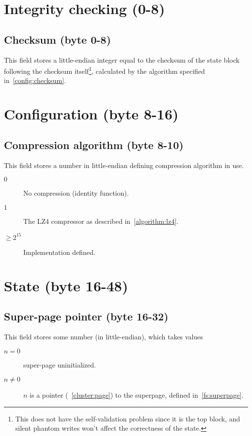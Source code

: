 \documentclass[11pt,a4paper]{report}
\begin{document}
    \section{Integrity checking (0-8)}
        \subsection{Checksum (byte 0-8)}
        This field stores a little-endian integer equal to the checksum of the
        state block following the checksum itself\footnote{This does not have
        the self-validation problem since it is the top block, and silent
        phantom writes won't affect the correctness of the state.}, calculated by
        the algorithm specified in~\ref{config:checksum}.

    \section{Configuration (byte 8-16)}
        \subsection{Compression algorithm (byte 8-10)}
        \label{config:compression}
        This field stores a number in little-endian defining compression
        algorithm in use.

        \begin{description}
            \item [$0$] No compression (identity function).
            \item [$1$] The LZ4 compressor as described
                in~\ref{algorithm:lz4}.
            \item [$\geq 2^{15}$] Implementation defined.
        \end{description}

    \section{State (byte 16-48)}
        \subsection{Super-page pointer (byte 16-32)}
        This field stores some number (in little-endian), which takes values

        \begin{description}
            \item [$n = 0$]    super-page uninitialized.
            \item [$n \neq 0$] $n$ is a pointer (~\ref{cluster:page}) to the
                superpage, defined in~\ref{fs:superpage}.
        \end{description}
\end{document}
